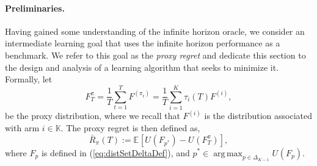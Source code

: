 \documentclass[final,12pt]{colt2018}
\newcommand{\prn}[1]{\left( #1 \right)}
\newcommand{\brk}[1]{\left\lbrack #1 \right\rbrack}
\newcommand{\EEBrk}[2][]{\mathbb{E}_{#1}\brk{#2}}
\DeclareMathOperator*{\argmax}{arg\,max}
\newcommand{\policy}[1][]{\pi^{#1}}
\newcommand{\policyAt}[2][]{\policy[#1]_{#2}}
\newcommand{\RHat}[1][]{{U}^{#1}}
\newcommand{\RHatFunc}[2][]{\RHat[{#1}] \prn{#2}}
\newcommand{\FProxPi}[2][\policy]{{F}_{#2}^{#1}}
\newcommand{\Fp}[1][p]{F_{#1}}
\newcommand{\FpOpt}{F_{p^*}}
\newcommand{\Fi}[1][i]{F^{\prn{{#1}}}}
\newcommand{\simplex}{\Delta_{K-1}}
\newcommand{\actionSet}{\mathds{K}}
\newcommand{\tauIAt}[2][i]{\tau_{#1} \prn{#2}}
\newcommand{\tauI}[1][i]{\tauIAt[#1]{T}}
\newcommand{\pseudoRegret}[1][\policy]{\bar{R}_{#1}\prn{T}}
\begin{document}
	\paragraph{Preliminaries.} Having gained some understanding of the infinite horizon oracle, we consider an intermediate learning goal that uses the infinite horizon performance as a benchmark. We refer to this goal as the \textit{proxy regret} and dedicate this section to the design and analysis of a learning algorithm that seeks to minimize it. Formally, let
	\begin{equation}\label{eq:FProxDef}
	\FProxPi{T} = \frac{1}{T}\sum_{t=1}^{T} \Fi[\policyAt{t}] = \frac{1}{T}\sum_{i=1}^{K} \tauI \Fi,
	\end{equation}
	be the proxy distribution, where we recall that $\Fi$ is the distribution associated with arm $i \in \actionSet$. The proxy regret is then defined as,
	\begin{equation} \label{eq:proxyRegretDef}
	\pseudoRegret := \EEBrk{\RHatFunc{\FpOpt} - \RHatFunc{\FProxPi{T}}},
	\end{equation}
	where $\Fp$ is defined in (\ref{eq:distSetDeltaDef}), and $p^* \in \argmax_{p \in \simplex} \RHatFunc{\Fp}$.
	
\end{document}
